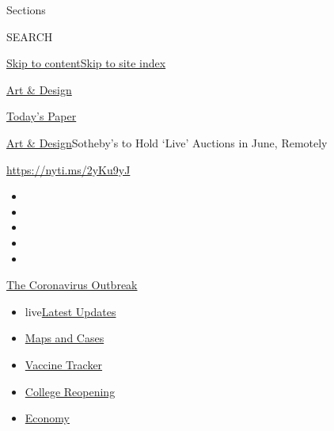 Sections

SEARCH

\protect\hyperlink{site-content}{Skip to
content}\protect\hyperlink{site-index}{Skip to site index}

\href{https://www.nytimes3xbfgragh.onion/section/arts/design}{Art \&
Design}

\href{https://myaccount.nytimes3xbfgragh.onion/auth/login?response_type=cookie\&client_id=vi}{}

\href{https://www.nytimes3xbfgragh.onion/section/todayspaper}{Today's
Paper}

\href{/section/arts/design}{Art \& Design}\textbar{}Sotheby's to Hold
`Live' Auctions in June, Remotely

\url{https://nyti.ms/2yKu9yJ}

\begin{itemize}
\item
\item
\item
\item
\item
\end{itemize}

\href{https://www.nytimes3xbfgragh.onion/news-event/coronavirus?action=click\&pgtype=Article\&state=default\&region=TOP_BANNER\&context=storylines_menu}{The
Coronavirus Outbreak}

\begin{itemize}
\tightlist
\item
  live\href{https://www.nytimes3xbfgragh.onion/2020/08/03/world/coronavirus-covid-19.html?action=click\&pgtype=Article\&state=default\&region=TOP_BANNER\&context=storylines_menu}{Latest
  Updates}
\item
  \href{https://www.nytimes3xbfgragh.onion/interactive/2020/us/coronavirus-us-cases.html?action=click\&pgtype=Article\&state=default\&region=TOP_BANNER\&context=storylines_menu}{Maps
  and Cases}
\item
  \href{https://www.nytimes3xbfgragh.onion/interactive/2020/science/coronavirus-vaccine-tracker.html?action=click\&pgtype=Article\&state=default\&region=TOP_BANNER\&context=storylines_menu}{Vaccine
  Tracker}
\item
  \href{https://www.nytimes3xbfgragh.onion/2020/08/02/us/covid-college-reopening.html?action=click\&pgtype=Article\&state=default\&region=TOP_BANNER\&context=storylines_menu}{College
  Reopening}
\item
  \href{https://www.nytimes3xbfgragh.onion/live/2020/08/03/business/stock-market-today-coronavirus?action=click\&pgtype=Article\&state=default\&region=TOP_BANNER\&context=storylines_menu}{Economy}
\end{itemize}

